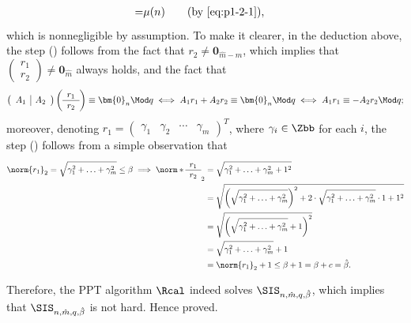 \begin{answer}[ii]
\begin{align*}
        =& \mu(n)\qquad (\textrm{by \eqref{eq:p1-2-1}}),
    \end{align*}
    which is nonnegligible by assumption. To make it clearer, in the deduction above, the step () follows from the fact that $r_2\neq \bm{0}_{\hat m -m}$, which implies that $\left(\begin{array}{c}r_1\\\hline r_2\end{array}\right)\neq \bm{0}_{\hat m}$ always holds, and the fact that 
    \[
        \left(\begin{array}{c|c} A_1&A_2\end{array}\right)\left(\begin{array}{c}r_1\\\hline r_2\end{array}\right)\equiv \bm{0}_{n}\Mod q
        \iff
        A_1r_1+A_2r_2\equiv \bm{0}_{n}\Mod q
        \iff
        A_1r_1\equiv-A_2r_2\Mod q;
    \] moreover, denoting $r_1=\begin{pmatrix}
        \gamma_1 & \gamma_2 & \cdots & \gamma_m
    \end{pmatrix}^T$, where $\gamma_i\in\Zbb$ for each $i$, the step () follows from a simple observation that
    \begin{align*}
        \norm{r_1}_2 = \sqrt{ \gamma_1^2+\ldots+ \gamma_m^2}\le \beta
        \implies 
        \norm*{\begin{array}{c}r_1\\\hline r_2\end{array}}_2 
        &=  \sqrt{ \gamma_1^2+\ldots+ \gamma_m^2+1^2}\\
        &=  \sqrt{\left(\sqrt{\gamma_1^2+\ldots+ \gamma_m^2}\right)^2+2\cdot \sqrt{\gamma_1^2+\ldots+ \gamma_m^2}\cdot 1+1^2}\\
        &=  \sqrt{\left(\sqrt{\gamma_1^2+\ldots+ \gamma_m^2}+1\right)^2}\\
        &=  \sqrt{\gamma_1^2+\ldots+ \gamma_m^2}+1\\
        &= \norm{r_1}_2 +1\le \beta+1=\beta+c=\hat\beta.
    \end{align*}

    Therefore, the PPT algorithm $\Rcal$ indeed solves $\SIS_{n, \hat{m},q, \hat{\beta}}$, which implies that $\SIS_{n, \hat{m},q, \hat{\beta}}$ is not hard. Hence proved.
\end{answer}





